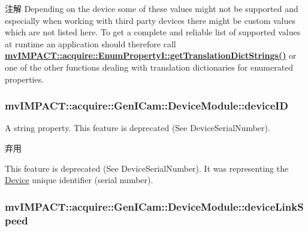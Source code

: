 \begin{DoxyNote}{注解}
Depending on the device some of these values might not be supported and especially when working with third party devices there might be custom values which are not listed here. To get a complete and reliable list of supported values at runtime an application should therefore call {\bfseries \hyperlink{classmv_i_m_p_a_c_t_1_1acquire_1_1_enum_property_i_a0ba6ccbf5ee69784d5d0b537924d26b6}{mv\+I\+M\+P\+A\+C\+T\+::acquire\+::\+Enum\+Property\+I\+::get\+Translation\+Dict\+Strings()}} or one of the other functions dealing with translation dictionaries for enumerated properties. 
\end{DoxyNote}
\hypertarget{classmv_i_m_p_a_c_t_1_1acquire_1_1_gen_i_cam_1_1_device_module_a656ceaaf54b8598e6bc71484c4d5734b}{
\subsubsection[{device\+I\+D}]{ mv\+I\+M\+P\+A\+C\+T\+::acquire\+::\+Gen\+I\+Cam\+::\+Device\+Module\+::device\+I\+D}}\label{classmv_i_m_p_a_c_t_1_1acquire_1_1_gen_i_cam_1_1_device_module_a656ceaaf54b8598e6bc71484c4d5734b}


A string property. This feature is deprecated (See Device\+Serial\+Number). 

\begin{DoxyRefDesc}{弃用}
\item[\hyperlink{deprecated__deprecated000099}{弃用}]This feature is deprecated (See Device\+Serial\+Number). It was representing the \hyperlink{classmv_i_m_p_a_c_t_1_1acquire_1_1_device}{Device} unique identifier (serial number). \end{DoxyRefDesc}
\hypertarget{classmv_i_m_p_a_c_t_1_1acquire_1_1_gen_i_cam_1_1_device_module_ae36bd32918b145962a52156da629adc8}{
\subsubsection[{device\+Link\+Speed}]{ mv\+I\+M\+P\+A\+C\+T\+::acquire\+::\+Gen\+I\+Cam\+::\+Device\+Module\+::device\+Link\+Speed}}\label{classmv_i_m_p_a_c_t_1_1acquire_1_1_gen_i_cam_1_1_device_module_ae36bd32918b145962a52156da629adc8}



